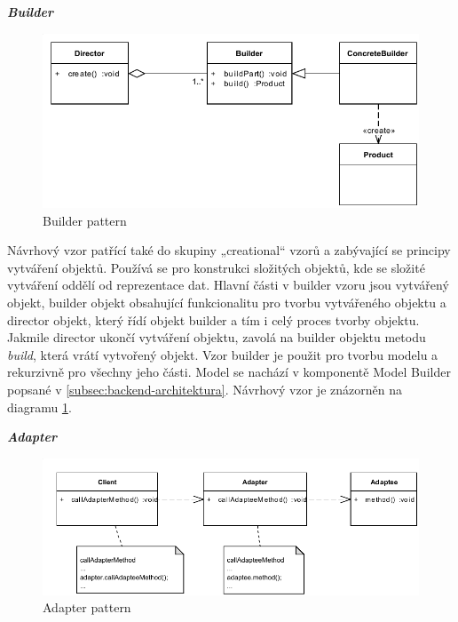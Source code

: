 \documentclass[11pt,twoside,a4paper]{book}
\begin{document}
\textbf{\textit{Builder}}

\begin{figure}[h]
\begin{center}
\includegraphics[width=13cm]{images-pdf/BuilderDesignPattern.pdf}
\caption{Builder pattern}
\label{fig:builder-pattern}
\end{center}
\end{figure}

Návrhový vzor patřící také do skupiny „creational“ vzorů a zabývající se
principy vytváření objektů. Používá se pro konstrukci složitých objektů, kde se
složité vytváření oddělí od reprezentace dat. Hlavní části v builder vzoru jsou
vytvářený objekt, builder objekt obsahující funkcionalitu pro tvorbu vytvářeného
objektu a director objekt, který řídí objekt builder a tím i celý proces tvorby
objektu. Jakmile director ukončí vytváření objektu, zavolá na builder objektu
metodu {\em build}, která vrátí vytvořený objekt. Vzor builder je použit pro
tvorbu modelu a rekurzivně pro všechny jeho části.
Model se nachází v komponentě Model Builder popsané v
\ref{subsec:backend-architektura}. Návrhový vzor je znázorněn na diagramu
\ref{fig:builder-pattern}.

\textbf{\textit{Adapter}}

\begin{figure}[h]
\begin{center}
\includegraphics[width=13cm]{images-pdf/AdapterDesignPattern.pdf}
\caption{Adapter pattern}
\label{fig:adapter-pattern}
\end{center}
\end{figure}
\end{document}
